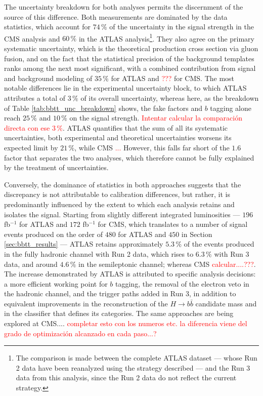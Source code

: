 The uncertainty breakdown for both analyses permits the discernment of the source of this difference. Both measurements are dominated by the data statistics, which account for $74\,\%$ of the uncertainty in the signal strength in the CMS analysis and $60\,\%$ in the ATLAS analysis\footnote{The comparison is made between the complete ATLAS dataset — whose Run 2 data have been reanalyzed using the strategy described — and the Run 3 data from this analysis, since the Run 2 data do not reflect the current strategy.}. They also agree on the primary systematic uncertainty, which is the theoretical production cross section via gluon fusion, and on the fact that the statistical precision of the background templates ranks among the next most significant, with a combined contribution from signal and background modeling of $35\,\%$ for ATLAS and \textcolor{red}{???} for CMS. The most notable differences lie in the experimental uncertainty block, to which ATLAS attributes a total of $3\,\%$ of its overall uncertainty, whereas here, as the breakdown of Table \ref{tab:bbtt_unc_breakdown} shows, the fake factors and $b$ tagging alone reach $25\,\%$ and $10\,\%$ on the signal strength. \textcolor{red}{Intentar calcular la comparación directa con ese $3\,\%$}. ATLAS quantifies that the sum of all its systematic uncertainties, both experimental and theoretical uncertainties worsens its expected limit by $21\,\%$, while CMS \textcolor{red}{...} However, this falls far short of the $1.6$ factor that separates the two analyses, which therefore cannot be fully explained by the treatment of uncertainties.


Conversely, the dominance of statistics in both approaches suggests that the discrepancy is not attributable to calibration differences, but rather, it is predominantly influenced by the extent to which each analysis retains and isolates the signal. Starting from slightly different integrated luminosities — $196$ fb$^{-1}$ for ATLAS and $172$ fb$^{-1}$ for CMS, which translates to a number of signal events produced on the order of $480$ for ATLAS and $450$ in Section \ref{sec:bbtt_results} — ATLAS retains approximately $5.3\,\%$ of the events produced in the fully hadronic channel with Run 2 data, which rises to $6.3\,\%$ with Run 3 data, and around $4.6\,\%$ in the semileptonic channel; whereas CMS \textcolor{red}{calcular....???}. The increase demonstrated by ATLAS is attributed to specific analysis decisions: a more efficient working point for $b$ tagging, the removal of the electron veto in the hadronic channel, and the trigger paths added in Run 3, in addition to equivalent improvements in the reconstruction of the $H\to b\bar{b}$ candidate mass and in the classifier that defines its categories. The same approaches are being explored at CMS.... \textcolor{red}{completar esto con los numeros etc. la diferencia viene del grado de optimización alcanzado en cada paso...?}


